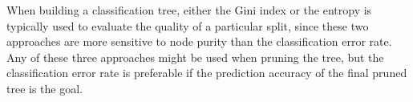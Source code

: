 \documentclass[a4paper, 12pt]{book}
\begin{document}
When building a classification tree, either the Gini index or the entropy is typically used to evaluate
the quality of a particular split, since these two approaches are more sensitive to node purity than 
the classification error rate. Any of these three approaches might be used when pruning the
tree, but the classification error rate is preferable if the prediction accuracy of the final pruned tree is the goal.   








\end{document}
